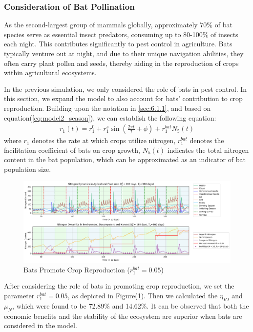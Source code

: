 \documentclass{mcmthesis}
\begin{document}
\subsubsection{Consideration of Bat Pollination}
As the second-largest group of mammals globally, approximately 70\% of bat species serve as essential insect predators, consuming up to 80-100\% of insects each night. This contributes significantly to pest control in agriculture. Bats typically venture out at night, and due to their unique navigation abilities, they often carry plant pollen and seeds, thereby aiding in the reproduction of crops within agricultural ecosystems\cite{bat_seed}.

In the previous simulation, we only considered the role of bats in pest control. In this section, we expand the model to also account for bats' contribution to crop reproduction. Building upon the notation in \ref{sec:6.1.1}, and based on equation(\ref{eq:model2_season}), we can establish the following equation:
\begin{align}
    r_1(t)  = r_{1}^{0} + r_{1}^{s}\sin \left( \frac{2\pi t}{T}+\phi \right) + r_1^{bat}N_5(t)
\end{align}
where $r_1$ denotes the rate at which crops utilize nitrogen, $r_1^{bat}$ denotes the facilitation coefficient of bats on crop growth, $N_5(t)$ indicates the total nitrogen content in the bat population, which can be approximated as an indicator of bat population size.
\begin{figure}[ht] 
\centering
\includegraphics[width=\textwidth]{figures/model3_food_web_Bat.png}
\setlength{\abovecaptionskip}{-0.5cm} 
\caption{Bats Promote Crop Reproduction ($r_1^{bat} = 0.05$)}
\label{fig:model3_foodWeb_bat}
\end{figure}

After considering the role of bats in promoting crop reproduction, we set the parameter $r_1^{bat} = 0.05$, as depicted in Figure(\ref{fig:model3_foodWeb_bat}). Then we calculated the $\eta_{IO}$ and $\mu_N$, which were found to be 72.89\% and 14.62\%. It can be observed that both the economic benefits and the stability of the ecosystem are superior when bats are considered in the model.
\end{document}
